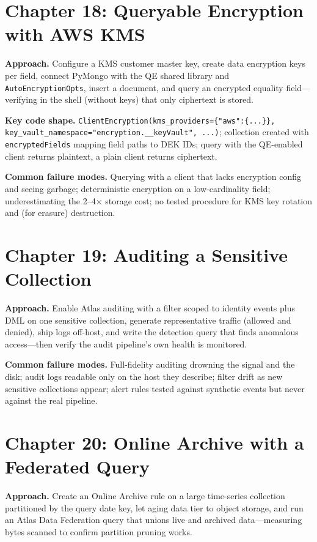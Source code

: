 \section{Chapter 18: Queryable Encryption with AWS KMS}
\textbf{Approach.} Configure a KMS customer master key, create data encryption keys per field,
connect PyMongo with the QE shared library and \texttt{AutoEncryptionOpts}, insert a document,
and query an encrypted equality field---verifying in the shell (without keys) that only
ciphertext is stored.

\textbf{Key code shape.} \texttt{ClientEncryption(kms\_providers=\{"aws":\{...\}\},
key\_vault\_namespace="encryption.\_\_keyVault", ...)}; collection created with
\texttt{encryptedFields} mapping field paths to DEK IDs; query with the QE-enabled client returns
plaintext, a plain client returns ciphertext.

\textbf{Common failure modes.} Querying with a client that lacks encryption config and seeing
garbage; deterministic encryption on a low-cardinality field; underestimating the 2--4$\times$
storage cost; no tested procedure for KMS key rotation and (for erasure) destruction.

\section{Chapter 19: Auditing a Sensitive Collection}
\textbf{Approach.} Enable Atlas auditing with a filter scoped to identity events plus DML on one
sensitive collection, generate representative traffic (allowed and denied), ship logs off-host,
and write the detection query that finds anomalous access---then verify the audit pipeline's own
health is monitored.

\textbf{Common failure modes.} Full-fidelity auditing drowning the signal and the disk; audit
logs readable only on the host they describe; filter drift as new sensitive collections appear;
alert rules tested against synthetic events but never against the real pipeline.

\section{Chapter 20: Online Archive with a Federated Query}
\textbf{Approach.} Create an Online Archive rule on a large time-series collection partitioned
by the query date key, let aging data tier to object storage, and run an Atlas Data Federation
query that unions live and archived data---measuring bytes scanned to confirm partition pruning
works.

